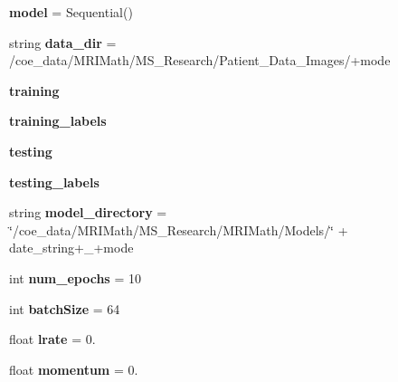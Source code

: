 \begin{DoxyCompactItemize}
{\bfseries model} = Sequential()
\item 
\mbox{\label{namespaceTrainModels2_a1fd23450b585dc3430e03b73b59aeba9}} 
string {\bfseries data\+\_\+dir} = \textquotesingle{}/coe\+\_\+data/M\+R\+I\+Math/M\+S\+\_\+\+Research/Patient\+\_\+\+Data\+\_\+\+Images/\textquotesingle{}+mode
\item 
\mbox{\label{namespaceTrainModels2_a59130aea1dbd65bee48e9acd0b5c6b0b}} 
{\bfseries training}
\item 
\mbox{\label{namespaceTrainModels2_ae01576d8f0e088ee69757586786009cb}} 
{\bfseries training\+\_\+labels}
\item 
\mbox{\label{namespaceTrainModels2_a094ec55806875ddf9d8581dd6d543fa1}} 
{\bfseries testing}
\item 
\mbox{\label{namespaceTrainModels2_ae23dd70cff8d8e5f4b2aa114d18d9cc0}} 
{\bfseries testing\+\_\+labels}
\item 
\mbox{\label{namespaceTrainModels2_ae22de447f4993b7e48e65ccd875d1631}} 
string {\bfseries model\+\_\+directory} = \char`\"{}/coe\+\_\+data/M\+R\+I\+Math/M\+S\+\_\+\+Research/M\+R\+I\+Math/Models/\char`\"{} + date\+\_\+string+\textquotesingle{}\+\_\+\textquotesingle{}+mode
\item 
\mbox{\label{namespaceTrainModels2_acaba5925d5bb1d7b599609ef04891e39}} 
int {\bfseries num\+\_\+epochs} = 10
\item 
\mbox{\label{namespaceTrainModels2_a0de09c8fcdaf58714b1656d2f293e587}} 
int {\bfseries batch\+Size} = 64
\item 
\mbox{\label{namespaceTrainModels2_ac4843b4ce3bdf626756ce2ceb94a4475}} 
float {\bfseries lrate} = 0.
\item 
\mbox{\label{namespaceTrainModels2_a00147cdd8cda009335bc43846f992dbc}} 
float {\bfseries momentum} = 0.
\item 
\mbox{\label{namespaceTrainModels2_a2325af8b38e784443450266320943c5c}} 

\end{DoxyCompactItemize}
